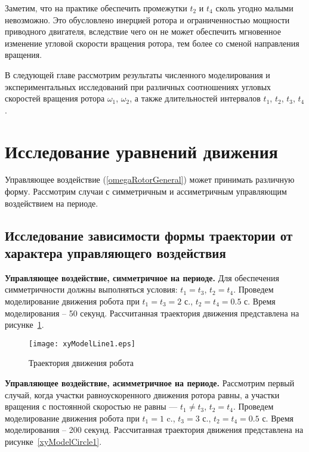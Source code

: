 Заметим, что на практике обеспечить промежутки $t_2$ и $t_4$ сколь угодно малыми невозможно. Это обусловлено инерцией ротора и ограниченностью мощности приводного двигателя, вследствие чего он не может обеспечить мгновенное изменение угловой скорости вращения ротора, тем более со сменой направления вращения.

В следующей главе рассмотрим результаты численного моделирования и экспериментальных исследований при различных соотношениях угловых скоростей вращения ротора $\omega_1$, $\omega_2$, а также длительностей интервалов $t_1$, $t_2$, $t_3$, $t_4$.


\section{Исследование уравнений движения}

Управляющее воздействие (\ref{omegaRotorGeneral}) может принимать различную форму. Рассмотрим случаи с симметричным  и ассиметричным управляющим воздействием на периоде. %


\subsection{Исследование зависимости формы траектории от характера управляющего воздействия}



\textbf{Управляющее воздействие, симметричное на периоде.} Для обеспечения симметричности должны выполняться условия: $t_1=t_3$, $t_2=t_4$. Проведем моделирование движения робота при $t_1=t_3=2$ с., $t_2=t_4 = 0.5$ с. Время моделирования -- 50 секунд. Рассчитанная траектория движения представлена на рисунке~\ref{xyModelLine1}.

\begin{figure}[!ht]
	\centering
	\texttt{[image: xyModelLine1.eps]}
	\caption{Траектория движения робота}
	\label{xyModelLine1}
\end{figure}

\textbf{Управляющее воздействие, асимметричное на периоде.} Рассмотрим первый случай, когда участки равноускоренного движения ротора равны, а участки вращения с постоянной скоростью не равны --- $t_1 \neq t_3$, $t_2=t_4$. Проведем моделирование движения робота при $t_1=1$ c., $t_3=3$ с., $t_2=t_4 = 0.5$ с. Время моделирования -- 200 секунд. Рассчитанная траектория движения представлена на рисунке~\ref{xyModelCircle1}.

